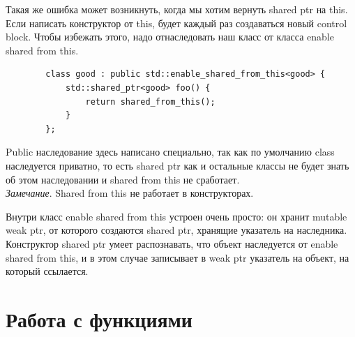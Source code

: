 \documentclass[12pt, a4paper]{article}
\begin{document}
	Такая же ошибка может возникнуть, когда мы хотим вернуть shared ptr на this. Если написать конструктор от this, будет каждый раз создаваться новый control block. Чтобы избежать этого, надо отнаследовать наш класс от класса enable shared from this.
	\begin{verbatim}
		class good : public std::enable_shared_from_this<good> {
			std::shared_ptr<good> foo() {
				return shared_from_this();
			}
		};
	\end{verbatim}
	Public наследование здесь написано специально, так как по умолчанию class наследуется приватно, то есть shared ptr как и остальные классы не будет знать об этом наследовании и shared from this не сработает.
	\\\textit{Замечание}. Shared from this не работает в конструкторах.
	\par Внутри класс enable shared from this устроен очень просто: он хранит mutable weak ptr, от которого создаются shared ptr, хранящие указатель на наследника. Конструктор shared ptr умеет распознавать, что объект наследуется от enable shared from this, и в этом случае записывает в weak ptr указатель на объект, на который ссылается.
	\section{Работа с функциями}
\end{document}

